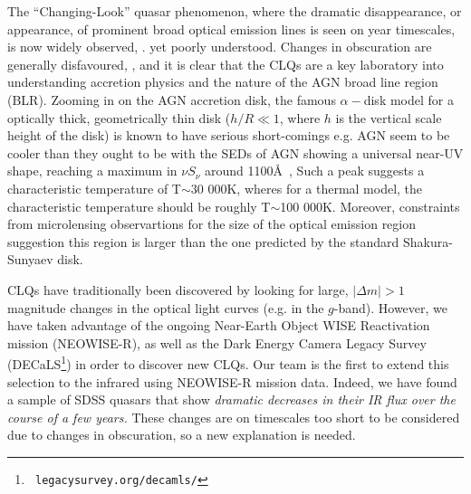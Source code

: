 \documentclass{nature}
\begin{document}

The ``Changing-Look'' quasar phenomenon, where the dramatic
disappearance, or appearance, of prominent broad optical emission
lines is seen on year timescales, is now widely observed,
\cite{LaMassa15, MacLeod16, Runnoe16, Ruan16, Gezari17, Rumbaugh17}.
yet poorly understood. Changes in obscuration are generally disfavoured, 
\cite{Hutsemekers17, Sheng17}, and it is clear that the CLQs are a
key laboratory into understanding accretion physics and the nature of
the AGN broad line region (BLR).
Zooming in on the AGN accretion disk, the famous $\alpha-$disk model \cite{SS73} for a optically thick,
geometrically thin disk ($h / R \ll 1$, where $h$ is the vertical
scale height of the disk) is known to have serious short-comings
e.g. \cite{Antonucci99, Koratkar_Blaes99, Lawrence12} AGN seem to be
cooler than they ought to be \cite[e.g., ][]{Lawrence12} with the SEDs
of AGN showing a universal near-UV shape, reaching a maximum in $\nu
S_{\nu}$ around 1100\AA\ , Such a peak suggests a characteristic
temperature of T$\sim$30 000K, wheres for a thermal model, the
characteristic temperature should be roughly T$\sim$100 000K.
Moreover, constraints from microlensing observartions for the size of
the optical emission region \cite[e.g., ]{Pooley07, Morgan10,
Morgan12, Mosquera11} suggestion this region is larger than the one
predicted by the standard Shakura-Sunyaev disk.

CLQs have traditionally been discovered by looking for large, $|
\Delta m | >1$ magnitude changes in the optical light curves (e.g. in
the $g$-band). However, we have taken advantage of the ongoing
Near-Earth Object WISE Reactivation mission
(NEOWISE-R)\cite{Mainzer14, Meisner17, Meisner17b}, as well as the
Dark Energy Camera Legacy Survey (DECaLS\footnote{{\tt
legacysurvey.org/decamls/}}) in order to discover new CLQs. Our team
is the first to extend this selection to the infrared using NEOWISE-R
mission data. Indeed, we have found a sample of SDSS quasars that show
{\it dramatic decreases in their IR flux over the course of a few
years.}  These changes are on timescales too short to be considered
due to changes in obscuration, so a new explanation is needed.
\end{document}
